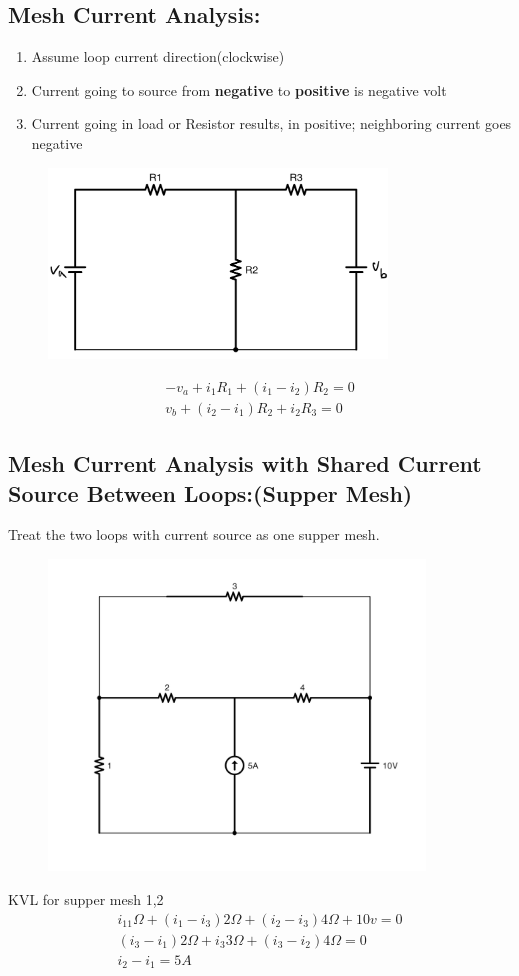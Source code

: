 \documentclass[a4paper,12]{article}
\begin{document}
\subsection{Mesh Current Analysis:}
\begin{enumerate}
    \item Assume loop current direction(clockwise)
    \item Current going to source from \textbf{negative} to \textbf{positive} is negative volt
    \item Current going in load or Resistor results, in positive; neighboring current goes negative
\end{enumerate}
\begin{figure}[H]
    \centering
    \includegraphics[width=90mm]{Image/9.jpg}
\end{figure}
\begin{align}
    -v_a+i_1R_1+(i_1-i_2)R_2=0\\
    v_b+(i_2-i_1)R_2+i_2R_3=0
\end{align}
\subsection{Mesh Current Analysis with Shared Current Source Between Loops:(Supper Mesh) }
Treat the two loops with current source as one supper mesh.
\begin{figure}[H]
    \centering
    \includegraphics[width=100mm]{Image/10.jpg}
\end{figure}
KVL for supper mesh 1,2
\begin{align}
    i_11\Omega+(i_1-i_3)2\Omega+(i_2-i_3)4\Omega+10v=0\\
    (i_3-i_1)2\Omega+i_3 3\Omega +(i_3-i_2)4\Omega=0\\
    i_2-i_1=5A 
\end{align}
\end{document}
